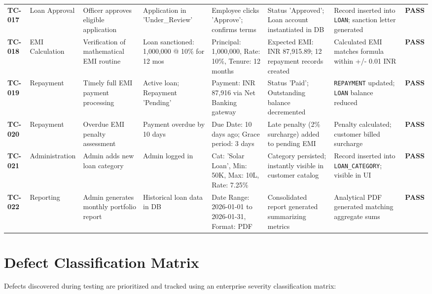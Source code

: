 \documentclass[12pt,a4paper,oneside]{report}
\begin{document}
\begin{table}[htbp]
\begin{tabularx}{\textwidth}{p{2.5cm} X X X X X X X}
\textbf{TC-017} & Loan Approval & Officer approves eligible application & Application in 'Under\_Review' & Employee clicks 'Approve'; confirms terms & Status 'Approved'; Loan account instantiated in DB & Record inserted into \texttt{LOAN}; sanction letter generated & \textbf{PASS} \\
\textbf{TC-018} & EMI Calculation & Verification of mathematical EMI routine & Loan sanctioned: 1,000,000 @ 10\% for 12 mos & Principal: 1,000,000, Rate: 10\%, Tenure: 12 months & Expected EMI: INR 87,915.89; 12 repayment records created & Calculated EMI matches formula within +/- 0.01 INR & \textbf{PASS} \\
\textbf{TC-019} & Repayment & Timely full EMI payment processing & Active loan; Repayment 'Pending' & Payment: INR 87,916 via Net Banking gateway & Status 'Paid'; Outstanding balance decremented & \texttt{REPAYMENT} updated; \texttt{LOAN} balance reduced & \textbf{PASS} \\
\textbf{TC-020} & Repayment & Overdue EMI penalty assessment & Payment overdue by 10 days & Due Date: 10 days ago; Grace period: 3 days & Late penalty (2\% surcharge) added to pending EMI & Penalty calculated; customer billed surcharge & \textbf{PASS} \\
\textbf{TC-021} & Administration & Admin adds new loan category & Admin logged in & Cat: 'Solar Loan', Min: 50K, Max: 10L, Rate: 7.25\% & Category persisted; instantly visible in customer catalog & Record inserted into \texttt{LOAN\_CATEGORY}; visible in UI & \textbf{PASS} \\
\textbf{TC-022} & Reporting & Admin generates monthly portfolio report & Historical loan data in DB & Date Range: 2026-01-01 to 2026-01-31, Format: PDF & Consolidated report generated summarizing metrics & Analytical PDF generated matching aggregate sums & \textbf{PASS} \\
\bottomrule
\end{tabularx}
\end{table}

\section{Defect Classification Matrix}

Defects discovered during testing are prioritized and tracked using an enterprise severity classification matrix:
\end{document}
